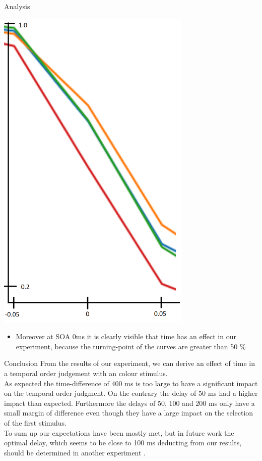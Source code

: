 \documentclass[a0paper,portrait]{baposter}
\begin{document}
\begin{poster}
\begin{posterbox}[name=results,span=1,column=2,row=0]{Analysis}
			\begin{center}
				\includegraphics[width=0.7\textwidth]{imgs/data_extract1.png}
			\end{center}
			
			\begin{itemize}
				\item Moreover at SOA 0ms it is clearly visible that time has an effect in our experiment, because the turning-point of the curves are greater than 50 \%
			\end{itemize}
			
		\end{posterbox}
		
		\begin{posterbox}[name=conclusion,span=1,column=2,row=2,below=results]{Conclusion}
			From the results of our experiment, we can derive an effect of time in a temporal order judgement with an colour stimulus.\\
			As expected the time-difference of 400 ms is too large to have a significant impact on the temporal order judgment. On the contrary the delay of 50 ms had a higher impact than expected. Furthermore the delays of 50, 100 and 200 ms only have a small margin of difference even though they have a large impact on the selection of the first stimulus.\\
			To sum up our expectations have been mostly met, but in future work the optimal delay, which seems to be close to 100 ms deducting from our results, should be determined in another experiment .
			\vspace{18pt}
		\end{posterbox}
		

\end{poster}
\end{document}
